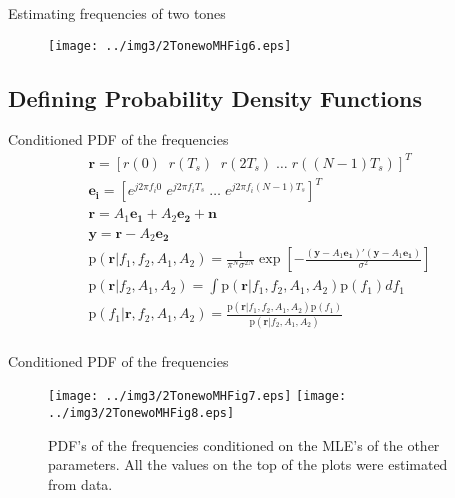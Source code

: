 ﻿\documentclass[mathserif]{beamer}
\begin{document}
	\begin{frame}{Estimating frequencies of two tones}
		\begin{figure}
			\centering
			\texttt{[image: ../img3/2TonewoMHFig6.eps]}
		\end{figure}
	\end{frame}
	\subsection{Defining Probability Density Functions}
	\begin{frame}{Conditioned PDF of the frequencies}
		\begin{gather*}
			\mathbf{r} =  [r(0) \; \; r(T_s) \; \; r(2T_s) \; \dots \; r((N-1)T_s)]^T \\
			\mathbf{e_i} =  [e^{j2\pi f_i0} \; e^{j2\pi f_iT_s} \; \dots \; e^{j2\pi f_i(N-1)T_s}]^T \\
			\mathbf{r} =  A_1\mathbf{e_1}+A_2\mathbf{e_2}+\mathbf{n}\\
			\mathbf{y} =\mathbf{r} - A_2\mathbf{e_2}\\
			\mathrm{p}(\mathbf{r}|f_1,f_2,A_1,A_2) = \frac{1}{\pi^N\sigma^{2N}}
			\exp\left[-\frac{(\mathbf{y}-A_1\mathbf{e_1})'(\mathbf{y}-A_1\mathbf{e_1})}{\sigma^2}\right] \\
			\mathrm{p}(\mathbf{r}|f_2,A_1,A_2) = \int \mathrm{p}(\mathbf{r}|f_1,f_2,A_1,A_2)\mathrm{p}(f_1)df_1\\
			\mathrm{p}(f_1|\mathbf{r},f_2,A_1,A_2) = \frac{\mathrm{p}(\mathbf{r}|f_1,f_2,A_1,A_2)\mathrm{p}(f_1)}{\mathrm{p}(\mathbf{r}|f_2,A_1,A_2)} \\
		\end{gather*}
	\end{frame}
	
	\begin{frame}{Conditioned PDF of the frequencies}
		\begin{figure}
			\centering
			\texttt{[image: ../img3/2TonewoMHFig7.eps]}
			\texttt{[image: ../img3/2TonewoMHFig8.eps]}
			\caption{PDF's of the frequencies conditioned on the MLE's of the other parameters. All the values on the top of the plots were estimated from data.}
		\end{figure}
	\end{frame}
	
\end{document}
